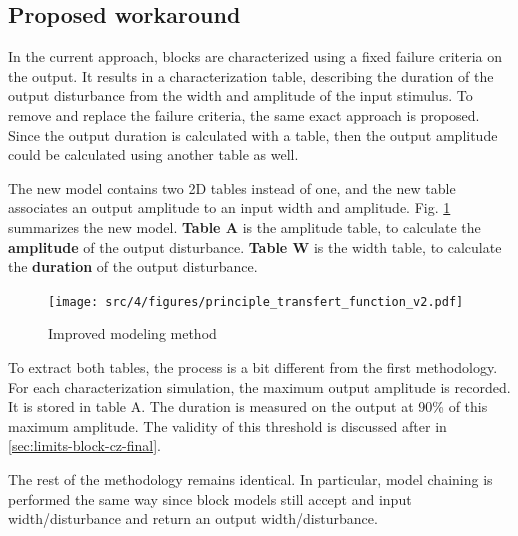 \subsection{Proposed workaround}

%
In the current approach, blocks are characterized using a fixed failure criteria on the output.
It results in a characterization table, describing the duration of the output disturbance from the width and amplitude of the input stimulus.
To remove and replace the failure criteria, the same exact approach is proposed.
Since the output duration is calculated with a table, then the output amplitude could be calculated using another table as well.

The new model contains two 2D tables instead of one, and the new table associates an output amplitude to an input width and amplitude.
Fig. \ref{fig:principle-transfert-func-v2} summarizes the new model.
\textbf{Table A} is the amplitude table, to calculate the \textbf{amplitude} of the output disturbance.
\textbf{Table W} is the width table, to calculate the \textbf{duration} of the output disturbance.

\begin{figure}[!h]
  \centering
  \texttt{[image: src/4/figures/principle\_transfert\_function\_v2.pdf]}
  \caption{Improved modeling method}
  \label{fig:principle-transfert-func-v2}
\end{figure}

To extract both tables, the process is a bit different from the first methodology.
For each characterization simulation, the maximum output amplitude is recorded.
It is stored in table A.
The duration is measured on the output at 90\% of this maximum amplitude.
The validity of this threshold is discussed after in \ref{sec:limits-block-cz-final}.

The rest of the methodology remains identical.
In particular, model chaining is performed the same way since block models still accept and input width/disturbance and return an output width/disturbance.


